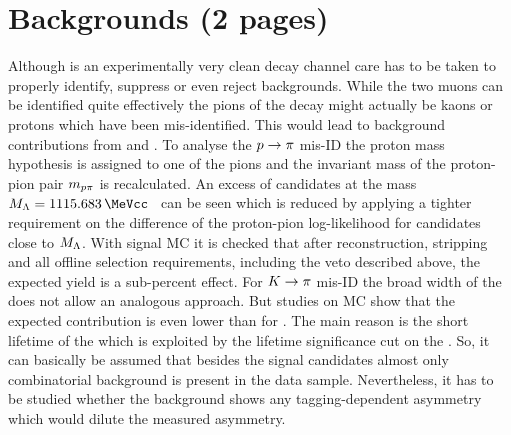 \newpage
\section{Backgrounds (2 pages)}
\label{sec:bd2jpsiks:backgrounds}

Although \BdToJPsiKS is an experimentally very clean decay channel care has to
be taken to properly identify, suppress or even reject backgrounds. While the
two muons can be identified quite effectively the pions of the \KS decay might
actually be kaons or protons which have been mis-identified. This would lead
to background contributions from \BdToJPsiKst and \LbToJPsiL. To analyse the
${p} \rightarrow {\ensuremath{\pi}}$ mis-ID the proton mass hypothesis is assigned to one of
the pions and the invariant mass of the proton-pion pair $m_{{p}{\pi}}$ is
recalculated. An excess of candidates at the \Lz mass $M_{\Lz} =
\SI{1115.683}{\MeVcc}$~\cite{PDG2014} can be seen which is reduced by applying
a tighter requirement on the difference of the proton-pion log-likelihood for
candidates close to $M_{{\Lambda}}$. With \LbToJPsiL signal MC it is checked that
after reconstruction, stripping and all offline selection requirements,
including the veto described above, the expected yield is a sub-percent
effect. For ${K} \rightarrow {\ensuremath{\pi}}$ mis-ID the broad width of the \Kstarz does not
allow an analogous approach. But studies on \BdToJPsiKst MC show that the
expected contribution is even lower than for \LbToJPsiL. The main reason is
the short lifetime of the \Kstarz which is exploited by the lifetime
significance cut on the \KS. So, it can basically be assumed that besides the
signal candidates almost only combinatorial background is present in the data
sample. Nevertheless, it has to be studied whether the background shows any
tagging-dependent asymmetry which would dilute the measured \CP asymmetry.

